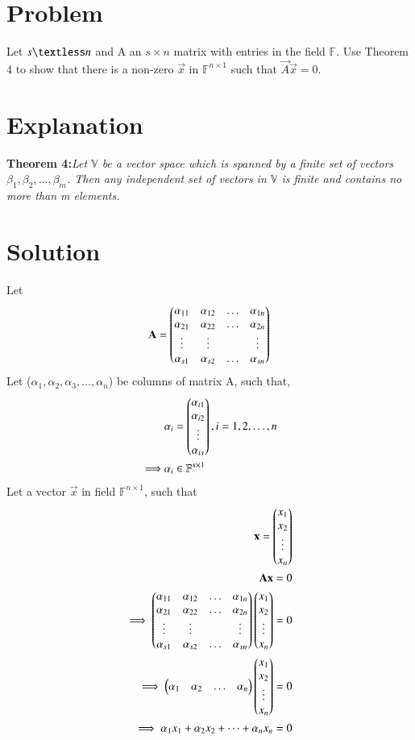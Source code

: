\documentclass[journal,12pt,twocolumn]{IEEEtran}
\begin{document}
\section{Problem}
Let $s \textless n$ and A an $s\times n$ matrix with entries in the field $\mathbb{F}$. Use Theorem 4 to show that there is a non-zero $\vec{x}$ in $\mathbb{F}^{n\times 1}$ such that $\vec{A}\vec{x}=0$. 
\section{Explanation}
\textbf{Theorem 4:}\textit{Let $\mathbb{V}$ be a vector space which is spanned by a finite set of vectors $\beta_1,\beta_2,...,\beta_m$. Then any independent set of vectors in $\mathbb{V}$ is finite and contains no more than m elements.}
\section{Solution}
Let
\begin{align}
    \mathbf{A}=\begin{pmatrix}\alpha_{11} & \alpha_{12} & \dots&\alpha_{1n} \\ \alpha_{21} & \alpha_{22} & \dots&\alpha_{2n}\\\vdots &\vdots& &\vdots\\\alpha_{s1} & \alpha_{s2} & \dots&\alpha_{sn}\end{pmatrix} \label{eqmatrixA}
\end{align}
Let ($\alpha_1,\alpha_2,\alpha_3,\dots,\alpha_n$) be columns of matrix A, such that,
\begin{align}
    &\alpha_i=\begin{pmatrix}\alpha_{i1}\\\alpha_{i2}\\\vdots\\\alpha_{is}\end{pmatrix}, i=1,2,\dots,n\\
\implies & \alpha_i\in\mathbb{F}^{s\times 1}
\end{align}
Let a vector $\Vec{x}$ in field $\mathbb{F}^{n\times1}$, such that
\begin{align}
\mathbf{x}=\begin{pmatrix}x_1\\x_2\\\vdots\\x_n\end{pmatrix}\\
\mathbf{A}\mathbf{x}=0\\
\implies \begin{pmatrix}\alpha_{11} & \alpha_{12} & \dots&\alpha_{1n} \\ \alpha_{21} & \alpha_{22} & \dots&\alpha_{2n}\\\vdots &\vdots& &\vdots\\\alpha_{s1} & \alpha_{s2} & \dots&\alpha_{sn}\end{pmatrix}\begin{pmatrix}x_1\\x_2\\\vdots\\x_n\end{pmatrix}=0\\
\implies \begin{pmatrix}\alpha_1&\alpha_2&\dots&\alpha_n\end{pmatrix}\begin{pmatrix}x_1\\x_2\\\vdots\\x_n\end{pmatrix}=0\label{eqhomogeneous}\\
\implies \alpha_1x_1+\alpha_2x_2+\dots+\alpha_nx_n=0 \label{eqx}\\
\end{align}
\end{document}
